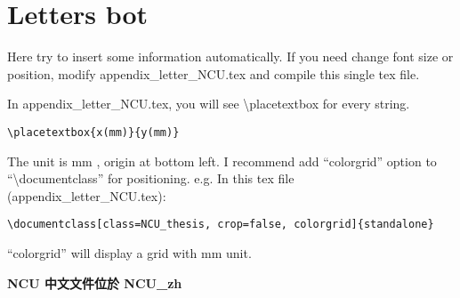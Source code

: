 \documentclass[class=NCU_thesis, crop=false]{standalone}
\begin{document}
\chapter{Letters bot}

Here try to insert some information automatically.
If you need change font size or position, modify appendix\_letter\_NCU.tex and compile this single tex file.

In appendix\_letter\_NCU.tex, you will see \textbackslash{}placetextbox for every string.
\begin{lstlisting}[style=LatexStyle,caption={}]
\placetextbox{x(mm)}{y(mm)}
\end{lstlisting}

The unit is mm , origin at bottom left. I recommend add ``colorgrid'' option to ``\textbackslash{}documentclass'' for positioning. e.g. In this tex file (appendix\_letter\_NCU.tex):

\begin{lstlisting}[style=LatexStyle,caption={}]
\documentclass[class=NCU_thesis, crop=false, colorgrid]{standalone}
\end{lstlisting}

``colorgrid'' will display a grid with mm unit. 

\begin{center}
{ \noindent\color{red}\bfseries\Large NCU 中文文件位於 NCU\_zh}
\end{center}


\def\title{\titleEn}

\cleardoublepage
\pagestyle{empty}
\sffamily


\end{document}
